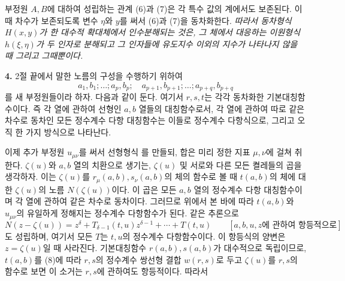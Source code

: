 부정원 \(A,B\)에 대하여 성립하는 관계 (6)과 (7)은 각 특수 값의 계에서도 보존된다. 이때 차수가 보존되도록 변수 \(\eta\)와 \(y\)를 써서 (6)과 (7)을 동차화한다. \emph{따라서 동차형식 \(H(x,y)\)가 한 대수적 확대체에서 인수분해되는 것은, 그 체에서 대응하는 이원형식 \(h(\xi,\eta)\)가 두 인자로 분해되고 그 인자들에 유도지수 이외의 지수가 나타나지 않을 때 그리고 그때뿐이다.}

\textbf{4.} 2절 끝에서 말한 노름의 구성을 수행하기 위하여
\[
a_1,b_1;\ldots;a_p,b_p;\quad
a_{p+1},b_{p+1};\ldots;a_{p+q},b_{p+q}
\]
를 새 부정원들이라 하자. 다음과 같이 둔다.
여기서 \(r,s,t\)는 각각 동차화한 기본대칭함수이다. 즉 각 열에 관하여 선형인 \(a,b\) 열들의 대칭함수로서, 각 열에 관하여 따로 같은 차수로 동차인 모든 정수계수 다항 대칭함수는 이들로 정수계수 다항식으로, 그리고 오직 한 가지 방식으로 나타난다.

이제 추가 부정원 \(u_{\mu\nu}\)를 써서 선형형식
를 만들되, 합은 미리 정한 지표 \(\mu,\nu\)에 걸쳐 취한다. \(\zeta(u)\)와 \(a,b\) 열의 치환으로 생기는, \(\zeta(u)\) 및 서로와 다른 모든 켤레들의 곱을 생각하자. 이는 \(\zeta(u)\)를 \(r_\mu(a,b),s_\nu(a,b)\)의 체의 함수로 볼 때 \(t(a,b)\)의 체에 대한 \(\zeta(u)\)의 노름 \(N(\zeta(u))\)이다. 이 곱은 모든 \(a,b\) 열의 정수계수 다항 대칭함수이며 각 열에 관하여 같은 차수로 동차이다. 그러므로 위에서 본 바에 따라 \(t(a,b)\)와 \(u_{\mu\nu}\)의 유일하게 정해지는 정수계수 다항함수가 된다.
같은 추론으로
\[
N(z-\zeta(u))=
z^\delta+T_{\delta-1}(t,u)z^{\delta-1}+\cdots+T(t,u)
\qquad[a,b,u,z\text{에 관하여 항등적으로}]
\]
도 성립하며, 여기서 모든 \(T\)는 \(t,u\)의 정수계수 다항함수이다. 이 항등식의 양변은 \(z=\zeta(u)\)일 때 사라진다. 기본대칭함수 \(r(a,b),s(a,b)\)가 대수적으로 독립이므로, \(t(a,b)\)를 (8)에 따라 \(r,s\)의 정수계수 쌍선형 결합 \(w(r,s)\)로 두고 \(\zeta(u)\)를 \(r,s\)의 함수로 보면 이 소거는 \(r,s\)에 관하여도 항등적이다. 따라서
\addtocounter{footnote}{1}

